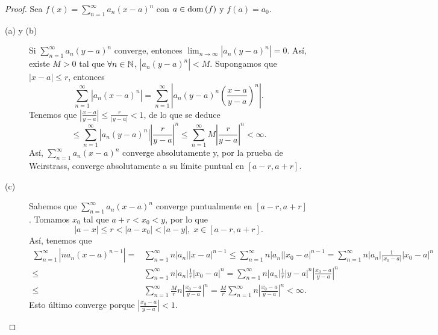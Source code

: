 \begin{proof}
Sea $\displaystyle f\left(x\right) = \sum^{\infty}_{n = 1}a_{n}\left(x-a\right)^{n} $ con $\displaystyle a \in \operatorname{dom}\left(f\right) $ y $\displaystyle f\left(a\right) = a_{0} $. 
\begin{description}
\item[(a) y (b)] Si $\displaystyle \sum^{\infty}_{n = 1}a_{n}\left(y-a\right)^{n} $ converge, entonces $\displaystyle \lim_{n \to \infty} \left|a_{n}\left(y-a\right)^{n}\right| = 0 $. Así, existe $\displaystyle M > 0 $ tal que $\displaystyle \forall n \in \mathbb{N} $, $\displaystyle \left|a_{n}\left(y-a\right)^{n}\right|<M $. Supongamos que $\displaystyle \left|x-a\right| \leq r $, entonces
	\[\sum^{\infty}_{n = 1} \left|a_{n}\left(x-a\right)^{n}\right| = \sum^{\infty}_{n = 1} \left|a_{n}\left(y-a\right)^{n}\left(\frac{x-a}{y-a}\right)^{n}\right| .\]
Tenemos que $\displaystyle \left|\frac{x-a}{y-a}\right| \leq \frac{r}{ \left|y-a\right|} < 1 $, de lo que se deduce
\[\leq \sum^{\infty}_{n = 1} \left|a_{n}\left(y-a\right)^{n}\right| \left|\frac{r}{y-a}\right|^{n} \leq \sum^{\infty}_{n = 1}M\left|\frac{r}{y-a}\right| ^{n} < \infty  .\]
Así, $\displaystyle \sum^{\infty}_{n = 1}a_{n}\left(x-a\right)^{n} $ converge absolutamente y, por la prueba de Weirstrass, converge absolutamente a su límite puntual en $\displaystyle \left[a-r, a + r\right]  $. 
\item[(c)] Sabemos que $\displaystyle \sum^{\infty}_{n = 1}a_{n}\left(x-a\right)^{n} $ converge puntualmente en $\displaystyle \left[a-r, a + r\right]  $. Tomamos $\displaystyle x_{0} $ tal que $\displaystyle a + r < x_{0} < y $, por lo que
	\[ \left|a-x\right| \leq r < \left|a-x_{0}\right| < \left|a-y\right|, \; x \in \left[a-r, a + r\right]  .\]
	Así, tenemos que 
\[
\begin{split}
	\sum^{\infty}_{n = 1} \left|n a_{n}\left(x-a\right)^{n-1}\right| = & \sum^{\infty}_{n = 1}n \left|a_{n}\right| \left|x-a\right|^{n-1}\leq \sum^{\infty}_{n = 1}n \left|a_{n}\right| \left|x_{0}-a\right|^{n-1} 
	=  \sum^{\infty}_{n = 1}n \left|a_{n}\right| \frac{1}{ \left| x_{0}-a\right|} \left|x_{0}-a\right|^{n} \\
	\leq & \sum^{\infty}_{n = 1}n \left|a_{n}\right| \frac{1}{r} \left|x_{0}-a\right|^{n}
	= \sum^{\infty}_{n = 1}n \left|a_{n}\right|\frac{1}{r} \left|y - a\right|^{n} \left|\frac{x_{0}-a}{y-a}\right|^{n}  \\
	\leq & \sum^{\infty}_{n = 1}\frac{M}{r}n \left|\frac{x_{0}-a}{y-a}\right|^{n} 
	=  \frac{M}{r}\sum^{\infty}_{n = 1}n \left|\frac{x_{0}-a}{y-a}\right|^{n} < \infty .
\end{split}
\]
Esto último converge porque $\displaystyle \left|\frac{x_{0}-a}{y - a}\right| < 1 $.
\end{description}
\end{proof}
